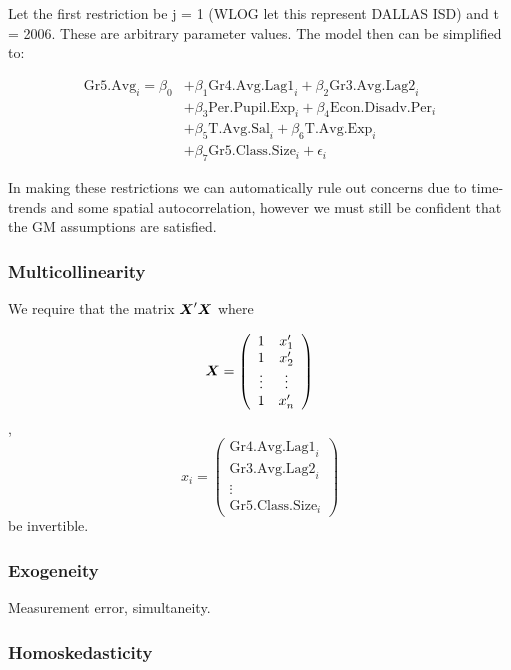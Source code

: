 \documentclass[11pt]{article}
\newcommand{\bX}{\mbox{\boldmath $X$}}
\begin{document}
Let the first restriction be j = 1 (WLOG let this represent DALLAS ISD) and t = 2006. These are arbitrary parameter values. The model then can be simplified to:

\begin{align*}
\mathrm{Gr5.Avg}_{i} = \beta_{0} 
    &+ \beta_{1}  \mathrm{Gr4.Avg.Lag1}_{i} 
    + \beta_{2}  \mathrm{Gr3.Avg.Lag2}_{i}    \\
    &+ \beta_{3}  \mathrm{Per.Pupil.Exp}_{i} 
    + \beta_{4}  \mathrm{Econ.Disadv.Per}_{i} \\
    &+ \beta_{5}  \mathrm{T.Avg.Sal}_{i}   
    + \beta_{6}  \mathrm{T.Avg.Exp}_{i}  \\
    &+ \beta_{7}  \mathrm{Gr5.Class.Size}_{i} + \epsilon_{i}
\end{align*}

In making these restrictions we can automatically rule out concerns due to time-trends and some spatial autocorrelation, however we must still be confident that the GM assumptions are satisfied.

\subsubsection{Multicollinearity}

We require that the matrix $\bX'\bX$ where

$$\bX = \left( \begin{array}{cc}
1 & x_1' \\ 1 & x_2' \\ \vdots & \vdots \\ 1 & x_n' \end{array}
\right)$$,    
$$x_i = \left( \begin{array}{cc}
 \mathrm{Gr4.Avg.Lag1}_{i} \\  \mathrm{Gr3.Avg.Lag2}_{i} \\ \vdots \\ \mathrm{Gr5.Class.Size}_{i} \end{array}
\right)$$ be invertible. 

\subsubsection{Exogeneity}

Measurement error, simultaneity.

\subsubsection{Homoskedasticity}
\end{document}
